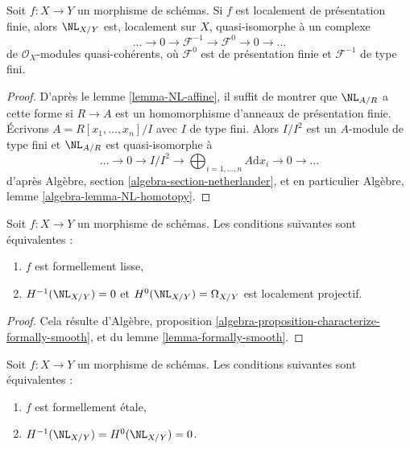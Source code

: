 \begin{lemma}
\label{lemma-netherlander-fp}
Soit $f : X \to Y$ un morphisme de schémas. Si $f$ est localement de
présentation finie, alors $\NL_{X/Y}$ est, localement sur $X$, quasi-isomorphe à
un complexe
$$
\ldots \to 0 \to \mathcal{F}^{-1} \to \mathcal{F}^0 \to 0 \to \ldots
$$
de $\mathcal{O}_X$-modules quasi-cohérents,
où $\mathcal{F}^0$ est de présentation finie
et $\mathcal{F}^{-1}$ de type fini.
\end{lemma}

\begin{proof}
D'après le lemme \ref{lemma-NL-affine}, il suffit de montrer que $\NL_{A/R}$
a cette forme si $R \to A$ est un homomorphisme d'anneaux de présentation finie.
Écrivons $A = R[x_1, \ldots, x_n]/I$ avec $I$ de type fini.
Alors $I/I^2$ est un
$A$-module de type fini et $\NL_{A/R}$ est quasi-isomorphe à
$$
\ldots \to 0 \to I/I^2 \to
\bigoplus\nolimits_{i = 1, \ldots, n} A\text{d}x_i \to 0 \to \ldots
$$
d'après Algèbre, section \ref{algebra-section-netherlander},
et en particulier
Algèbre, lemme \ref{algebra-lemma-NL-homotopy}.
\end{proof}

\begin{lemma}
\label{lemma-NL-formally-smooth}
Soit $f : X \to Y$ un morphisme de schémas. Les conditions suivantes sont équivalentes :
\begin{enumerate}
\item $f$ est formellement lisse,
\item $H^{-1}(\NL_{X/Y}) = 0$ et $H^0(\NL_{X/Y}) = \Omega_{X/Y}$
est localement projectif.
\end{enumerate}
\end{lemma}

\begin{proof}
Cela résulte d'Algèbre, proposition
\ref{algebra-proposition-characterize-formally-smooth},
et du lemme \ref{lemma-formally-smooth}.
\end{proof}

\begin{lemma}
\label{lemma-NL-formally-etale}
Soit $f : X \to Y$ un morphisme de schémas. Les conditions suivantes sont équivalentes :
\begin{enumerate}
\item $f$ est formellement étale,
\item $H^{-1}(\NL_{X/Y}) = H^0(\NL_{X/Y}) = 0$.
\end{enumerate}
\end{lemma}

